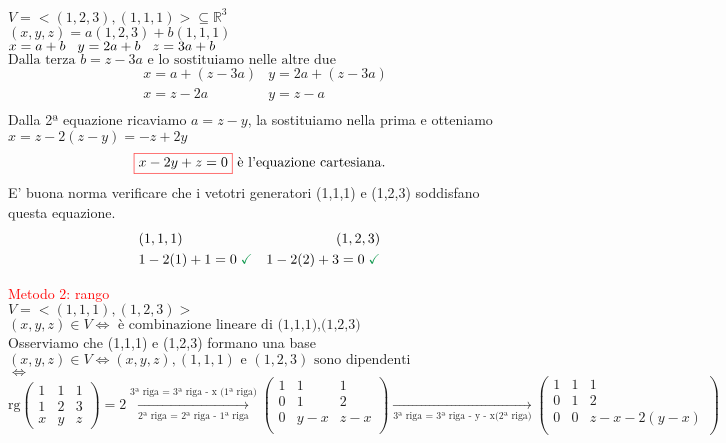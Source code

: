 \(
V = <(1,2,3),(1,1,1)> \subseteq \mathbb{R}^3
\)\\
\(
(x,y,z) = a(1,2,3) + b(1,1,1)
\)\\
\(
x = a + b \hspace{0.3cm} y = 2a + b \hspace{0.3cm} z = 3a + b
\)\\
\(
\text{Dalla terza } b = z - 3a \text{ e lo sostituiamo nelle altre due }
\)
\begin{align*}
	&x = a + (z - 3a) & y = 2a + (z - 3a)\\
	&x = z - 2a & y = z - a\\
\end{align*}
\vskip-2.5mm
\textsf{\small Dalla 2ª equazione ricaviamo $a = z - y$, la sostituiamo nella prima e otteniamo $x = z - 2(z - y) = -z + 2y$ }\\
\[
\color{red}\boxed{\normalcolor x - 2y + z = 0} \normalcolor \text{ è l'equazione cartesiana.}
\]
\enlargethispage{1\linewidth}
\textsf{\small E' buona norma verificare che i vetotri generatori (1,1,1) e (1,2,3) soddisfano questa equazione.}\\
\vskip-2.5mm
\begin{align*}
	&(1,1,1) & (1,2,3) \\
	&1 - 2(1) + 1 = 0 \hspace{.1cm}\textcolor{ForestGreen}{\checkmark} & 1 -2(2) + 3 = 0 \hspace{.1cm}\textcolor{ForestGreen}{\checkmark}\\
\end{align*}

\newpage

\textcolor{red}{Metodo 2: rango}\\

$V = <(1,1,1),(1,2,3)>$\\
\(
(x,y,z) \in V \Leftrightarrow \text{ è combinazione lineare di (1,1,1),(1,2,3)}
\)\\
\textsf{\small Osserviamo che (1,1,1) e (1,2,3) formano una base}\\
\(
(x,y,z) \in V \Leftrightarrow (x,y,z),(1,1,1) \text{ e } (1,2,3) \text{ sono dipendenti}
\)\\

$\Leftrightarrow$
\(
\text{rg}
\begin{pmatrix}
	1 & 1 & 1 \\
	1 & 2 & 3 \\
	x & y & z
\end{pmatrix}
= 2 \underset{\text{2ª riga = 2ª riga - 1ª riga}}{\overset{\text{3ª riga = 3ª riga - x (1ª riga)}}{\longrightarrow}}
\begin{pmatrix}
	1 & 1 & 1 \\
	0 & 1 & 2 \\
	0 & y-x & z-x \\
\end{pmatrix}
\underset{\text{3ª riga = 3ª riga - y - x(2ª riga)}}{\longrightarrow}
\begin{pmatrix}
	1 & 1 & 1 \\
	0 & 1 & 2 \\
	0 & 0 & z - x - 2(y - x) \\
\end{pmatrix}
\)\\

